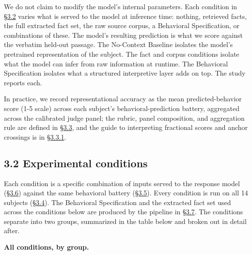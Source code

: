 We do not claim to modify the model's internal parameters. Each
condition in \hyperref[experimental-conditions]{§3.2} varies what is served to the model at inference time:
nothing, retrieved facts, the full extracted fact set, the raw source
corpus, a Behavioral Specification, or combinations of these. The
model's resulting prediction is what we score against the verbatim
held-out passage. The No-Context Baseline isolates the model's
pretrained representation of the subject. The fact and corpus conditions
isolate what the model can infer from raw information at runtime. The
Behavioral Specification isolates what a structured interpretive layer
adds on top. The study reports each.

In practice, we record representational accuracy as the mean
predicted-behavior score (1-5 scale) across each subject's
behavioral-prediction battery, aggregated across the calibrated judge
panel; the rubric, panel composition, and aggregation rule are defined
in \hyperref[scoring-rubric-with-calibrated-llm-judge-panel]{§3.3}, and the guide to interpreting fractional scores and anchor
crossings is in \hyperref[score-interpretation]{§3.3.1}.

\hypertarget{experimental-conditions}{%
\subsection{3.2 Experimental conditions}\label{experimental-conditions}}

Each condition is a specific combination of inputs served to the
response model (\hyperref[response-models]{§3.6}) against the same behavioral battery (\hyperref[question-battery-formation]{§3.5}). Every
condition is run on all 14 subjects (\hyperref[subjects]{§3.4}). The Behavioral Specification
and the extracted fact set used across the conditions below are produced
by the pipeline in \hyperref[pipeline-for-the-behavioral-specification]{§3.7}. The conditions separate into two groups,
summarized in the table below and broken out in detail after.

\textbf{All conditions, by group.}

